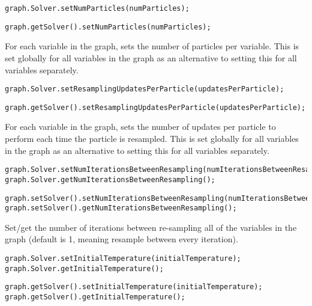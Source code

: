 
\ifmatlab
\begin{lstlisting}
graph.Solver.setNumParticles(numParticles);
\end{lstlisting}
\fi

\ifjava
\begin{lstlisting}
graph.getSolver().setNumParticles(numParticles);
\end{lstlisting}
\fi

For each variable in the graph, sets the number of particles per variable. This is set globally for all variables in the graph as an alternative to setting this for all variables separately.

\ifmatlab
\begin{lstlisting}
graph.Solver.setResamplingUpdatesPerParticle(updatesPerParticle);
\end{lstlisting}
\fi

\ifjava
\begin{lstlisting}
graph.getSolver().setResamplingUpdatesPerParticle(updatesPerParticle);
\end{lstlisting}
\fi

For each variable in the graph, sets the number of updates per particle to perform each time the particle is resampled. This is set globally for all variables in the graph as an alternative to setting this for all variables separately.

\ifmatlab
\begin{lstlisting}
graph.Solver.setNumIterationsBetweenResampling(numIterationsBetweenResampling);
graph.Solver.getNumIterationsBetweenResampling();
\end{lstlisting}
\fi

\ifjava
\begin{lstlisting}
graph.setSolver().setNumIterationsBetweenResampling(numIterationsBetweenResampling);
graph.setSolver().getNumIterationsBetweenResampling();
\end{lstlisting}
\fi

Set/get the number of iterations between re-sampling all of the variables in the graph (default is 1, meaning resample between every iteration).

\ifmatlab
\begin{lstlisting}
graph.Solver.setInitialTemperature(initialTemperature);
graph.Solver.getInitialTemperature();
\end{lstlisting}
\fi

\ifjava
\begin{lstlisting}
graph.getSolver().setInitialTemperature(initialTemperature);
graph.getSolver().getInitialTemperature();
\end{lstlisting}
\fi


